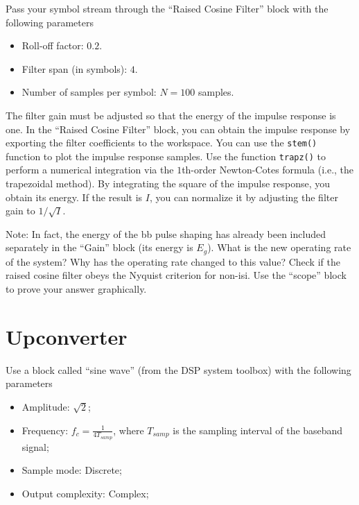 \documentclass[12pt,a4paper]{article}
\begin{document}
\problem Pass your symbol stream through the ``Raised Cosine Filter'' block with the following parameters
\begin{itemize}
    \item Roll-off factor: \(0.2\).
    \item Filter span (in symbols): \(4\).
    \item Number of samples per symbol: \(N=100\) samples.
\end{itemize}
The filter gain must be adjusted so that the energy of the impulse response is one. In the ``Raised Cosine Filter'' block, you can obtain the impulse response by exporting the filter coefficients to the workspace. You can use the \texttt{stem()} function to plot the impulse response samples. Use the function \texttt{trapz()} to perform a numerical integration via the \(1\)th-order Newton-Cotes formula (i.e., the trapezoidal method). By integrating the square of the impulse response, you obtain its energy. If the result is \(I\), you can normalize it by adjusting the filter gain to \(1/\sqrt{I}\).

Note: In fact, the energy of the \gls{bb} pulse shaping has already been included separately in the ``Gain'' block (its energy is \(E_g\)).
\subproblem What is the new operating rate of the system? Why has the operating rate changed to this value?
\subproblem Check if the raised cosine filter obeys the Nyquist criterion for non-\gls{isi}. Use the ``scope'' block to prove your answer graphically.

\section{Upconverter}

\problem Use a block called ``sine wave'' (from the DSP system toolbox) with the following parameters
\begin{itemize}
    \item Amplitude: \(\sqrt{2}\);
    \item Frequency: \(f_c = \frac{1}{4T_{samp}}\), where \(T_{samp}\) is the sampling interval of the baseband signal;
    \item Sample mode: Discrete;
    \item Output complexity: Complex;
\end{itemize}
\end{document}
